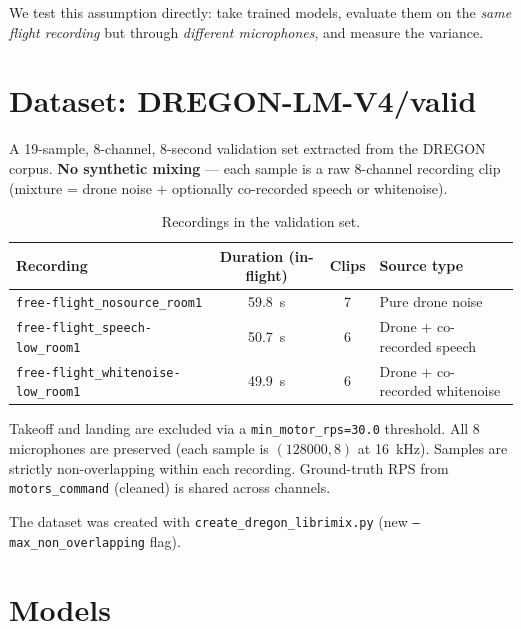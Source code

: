 \documentclass[11pt,a4paper]{article}
\newcommand{\rps}{\ensuremath{\mathrm{RPS}}}
\begin{document}
We test this assumption directly: take trained models, evaluate them on the
\emph{same flight recording} but through \emph{different microphones}, and measure
the variance.

\section{Dataset: DREGON-LM-V4/valid}

A 19-sample, 8-channel, 8-second validation set extracted from the DREGON
corpus. \textbf{No synthetic mixing} --- each sample is a raw 8-channel recording clip
(mixture = drone noise + optionally co-recorded speech or whitenoise).

\begin{table}[ht]
  \centering
  \caption{Recordings in the validation set.}
  \label{tab:dataset}
  \small
  \begin{tabular}{lccp{4.5cm}}
    \toprule
    Recording & Duration (in-flight) & Clips & Source type \\
    \midrule
    \texttt{free-flight\_nosource\_room1} & 59.8~s & 7 & Pure drone noise \\
    \texttt{free-flight\_speech-low\_room1} & 50.7~s & 6 & Drone + co-recorded speech \\
    \texttt{free-flight\_whitenoise-low\_room1} & 49.9~s & 6 & Drone + co-recorded whitenoise \\
    \bottomrule
  \end{tabular}
\end{table}

Takeoff and landing are excluded via a \texttt{min\_motor\_rps=30.0} threshold.
All 8 microphones are preserved (each sample is $(128000, 8)$ at 16~kHz).
Samples are strictly non-overlapping within each recording.
Ground-truth \rps{} from \texttt{motors\_command} (cleaned) is shared across channels.

The dataset was created with \texttt{create\_dregon\_librimix.py} (new \texttt{--max\_non\_overlapping} flag).

\section{Models}
\end{document}
